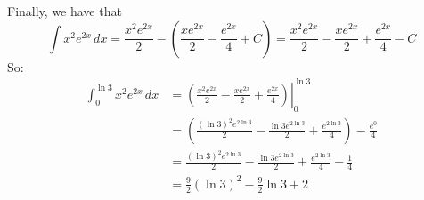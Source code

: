 \documentclass[main]{subfiles}
\begin{document}
\begin{enumerate}
\begin{enumerate}
\begin{solution}
     Finally, we have that $$ \int x^2 e^{2x}\,dx = \frac{x^2e^{2x}}{2} - \left(\frac{xe^{2x}}{2} - \frac{e^{2x}}{4} + C\right) = \frac{x^2e^{2x}}{2} -\frac{xe^{2x}}{2} + \frac{e^{2x}}{4} -C$$
     So:
     \begin{align*}
     \int_{0}^{\ln 3} x^2 e^{2x}\,dx &= \left. \left( \frac{x^2e^{2x}}{2} -\frac{xe^{2x}}{2} + \frac{e^{2x}}{4} \right) \right|_0^{\ln3} \\
     &= \left( \frac{(\ln 3)^2e^{2\ln 3}}{2} -\frac{\ln 3e^{2\ln 3}}{2} + \frac{e^{2\ln 3}}{4} \right) -  \frac{e^{0}}{4}  \\
     &= \frac{(\ln 3)^2e^{2\ln 3}}{2} -\frac{\ln 3e^{2\ln 3}}{2} + \frac{e^{2\ln 3}}{4} - \frac{1}{4} \\
     &= \boxed{\frac{9}{2} (\ln3)^2 - \frac{9}{2}\ln 3 + 2}
     \end{align*}
  \end{solution}  
  
\end{enumerate}


\end{enumerate}
\end{document}

